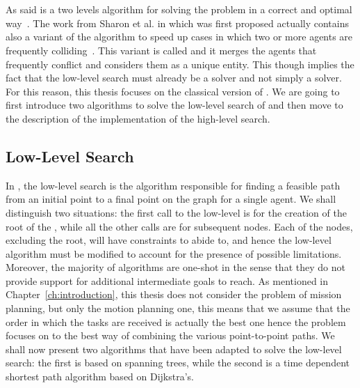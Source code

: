 \section{}
\label{sec:cbsAlgo}
As said \cbs is a two levels algorithm for solving the  problem in a
correct and optimal way~\cite{MAPF_overview}. The work from Sharon et al. in
which \cbs was first proposed actually contains also a variant of the algorithm
to speed up cases in which two or more agents are frequently
colliding~\cite{CBS}. This variant is called  and it merges the
agents that frequently conflict and considers them as a unique entity. This
though implies the fact that the low-level search must already be a 
solver and not simply a  solver. For this reason, this thesis
focuses on the classical version of . \newline
We are going to first introduce two algorithms to solve the low-level search of
\cbs and then move to the description of the implementation of the high-level
search.
%
%
\subsection{Low-Level Search}
In , the low-level search is the algorithm responsible for finding a
feasible path from an initial point to a final point on the graph for a single
agent. We shall distinguish two situations: the first call to the low-level is
for the creation of the root of the , while all the other calls are
for subsequent nodes. Each of the nodes, excluding the root, will have
constraints to abide to, and hence the low-level algorithm must be modified to
account for the presence of possible limitations. \newline 
Moreover, the majority of  algorithms are one-shot in the sense that
they do not provide support for additional intermediate goals to reach. As
mentioned in Chapter~\ref{ch:introduction}, this thesis does not consider the
problem of mission planning, but only the motion planning one, this means that
we assume that the order in which the tasks are received is actually the best
one hence the problem focuses on to the best way of combining the various
point-to-point paths. \newline
We shall now present two algorithms that have been adapted to solve the
low-level search: the first is based on spanning trees, while the second is a
time dependent shortest path algorithm based on Dijkstra's. 
%

